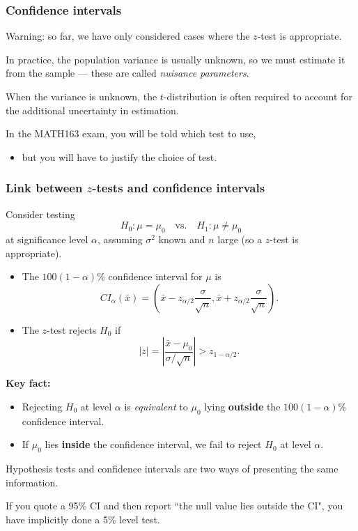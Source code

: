 \documentclass[t,8pt]{beamer}
\begin{document}
\begin{frame}
	\frametitle{Confidence intervals}
	Warning: so far, we have only considered cases where the $z$-test is appropriate. \par
	In practice, the population variance is usually unknown, so we must estimate it from the sample — these are called {\it nuisance parameters}. \par
	When the variance is unknown, the $t$-distribution is often required to account for the additional uncertainty in estimation. \par
	In the MATH163 exam, you will be told which test to use,
	\begin{itemize}
		\item but you will have to justify the choice of test.
	\end{itemize}
\end{frame}

\begin{frame}
	\frametitle{Link between $z$-tests and confidence intervals}
	Consider testing
	\[
	H_0:\mu=\mu_0 \quad\text{vs.}\quad H_1:\mu\neq\mu_0
	\]
	at significance level $\alpha$, assuming $\sigma^2$ known and $n$ large (so a $z$-test is appropriate).
	\begin{itemize}
		\item The $100(1-\alpha)\%$ confidence interval for $\mu$ is
		\[
		CI_{\alpha}(\bar x)=\left(\bar x-z_{\alpha/2}\frac{\sigma}{\sqrt n},
		\bar x+z_{\alpha/2}\frac{\sigma}{\sqrt n}\right).
		\]
		\item The $z$-test rejects $H_0$ if
		\[
		|z| = \left|\frac{\bar x-\mu_0}{\sigma/\sqrt n}\right| > z_{1-\alpha/2}.
		\]
	\end{itemize}
	{\bf Key fact:}
	\begin{itemize}
		\item Rejecting $H_0$ at level $\alpha$ is {\it equivalent} to $\mu_0$ lying {\bf outside} the $100(1-\alpha)\%$ confidence interval.
		\item If $\mu_0$ lies {\bf inside} the confidence interval, we fail to reject $H_0$ at level $\alpha$.
	\end{itemize}
	{\small\color{NavyBlue}
		Hypothesis tests and confidence intervals are two ways of presenting the same information. \par 
		If you quote a 95\% CI and then report ``the null value lies outside the CI", you have implicitly done a 5\% level test.
	}
\end{frame}
\end{document}
